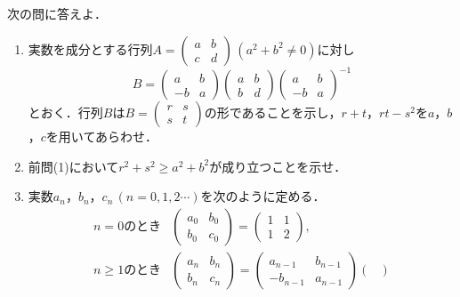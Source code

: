 \documentclass[../../main.tex]{subfiles}
\begin{document}
次の問に答えよ．
\begin{enumerate}
  \item 実数を成分とする行列$A=
    \begin{pmatrix}
      a & b \\ c & d
    \end{pmatrix}\, (a^2+b^2\neq 0)$に対し
    \begin{equation}
      B=
      \begin{pmatrix}
        a  & b \\
        -b & a
      \end{pmatrix}
      \begin{pmatrix}
        a & b \\
        b & d
      \end{pmatrix}
      \begin{pmatrix}
        a  & b \\
        -b & a
      \end{pmatrix}^{-1}
    \end{equation}
    とおく．行列$B$は$B=
    \begin{pmatrix}
      r & s \\ s & t
    \end{pmatrix}$の形であることを示し，$r+t$，$rt-s^2$を$a$，$b$，$c$を用いてあらわせ．
  \item 前問(1)において$r^2+s^2\ge a^2+b^2$が成り立つことを示せ．
  \item 実数$a_n$，$b_n$，$c_n\, (n=0,1,2\cdots)$を次のように定める．
    \begin{align}
      \text{$n=0$のとき}    &
      \begin{pmatrix}
        a_0 & b_0 \\
        b_0 & c_0
      \end{pmatrix} =
      \begin{pmatrix}
        1 & 1 \\
        1 & 2
      \end{pmatrix},       \\
      \text{$n\ge 1$のとき} &
      \begin{pmatrix}
        a_n & b_n \\
        b_n & c_n
      \end{pmatrix} =
      \begin{pmatrix}
        a_{n-1}  & b_{n-1} \\
        -b_{n-1} & a_{n-1}
      \end{pmatrix}
      \begin{pmatrix}

\end{pmatrix}
\end{align}
\end{enumerate}
\end{document}
